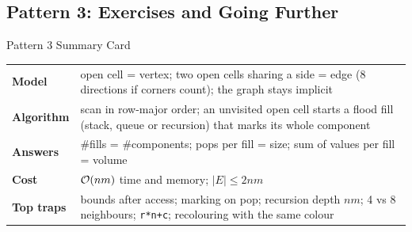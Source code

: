 \subsection{Pattern 3: Exercises and Going Further}
\label{ssec:ch1-p3-ex}

\begin{patternbox}{Pattern 3 Summary Card}
\begin{tabularx}{\linewidth}{@{}>{\bfseries}l X@{}}
Model & open cell = vertex; two open cells sharing a side = edge (8 directions if corners count); the graph stays implicit \\
Algorithm & scan in row-major order; an unvisited open cell starts a flood fill (stack, queue or recursion) that marks its whole component \\
Answers & \#fills = \#components; pops per fill = size; sum of values per fill = volume \\
Cost & $\mathcal{O}(nm)$ time and memory; $|E| \le 2nm$ \\
Top traps & bounds after access; marking on pop; recursion depth $nm$; 4 vs 8 neighbours; \texttt{r*n+c}; recolouring with the same colour \\
\end{tabularx}
\end{patternbox}

